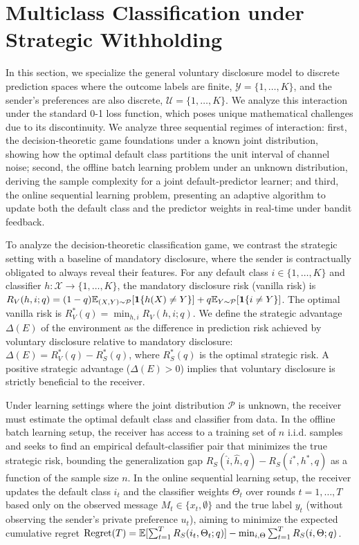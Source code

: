 \section{Multiclass Classification under Strategic Withholding}
\label{sec:classification}

In this section, we specialize the general voluntary disclosure model to discrete prediction spaces where the outcome labels are finite, $\mathcal{Y} = \{1, \dots, K\}$, and the sender's preferences are also discrete, $\mathcal{U} = \{1, \dots, K\}$. We analyze this interaction under the standard 0-1 loss function, which poses unique mathematical challenges due to its discontinuity. We analyze three sequential regimes of interaction: first, the decision-theoretic game foundations under a known joint distribution, showing how the optimal default class partitions the unit interval of channel noise; second, the offline batch learning problem under an unknown distribution, deriving the sample complexity for a joint default-predictor learner; and third, the online sequential learning problem, presenting an adaptive algorithm to update both the default class and the predictor weights in real-time under bandit feedback.

To analyze the decision-theoretic classification game, we contrast the strategic setting with a baseline of mandatory disclosure, where the sender is contractually obligated to always reveal their features. For any default class $i \in \{1,\dots,K\}$ and classifier $h: \mathcal{X} \to \{1,\dots,K\}$, the mandatory disclosure risk (vanilla risk) is $R_V(h, i; q) = (1 - q)\mathbb{E}_{(X, Y) \sim \mathcal{P}} [ \mathbf{1}\{h(X) \ne Y\} ] + q\mathbb{E}_{Y \sim \mathcal{P}} [ \mathbf{1}\{i \ne Y\} ]$. The optimal vanilla risk is $R_V^*(q) = \min_{h, i} R_V(h, i; q)$. We define the strategic advantage $\Delta(E)$ of the environment as the difference in prediction risk achieved by voluntary disclosure relative to mandatory disclosure: $\Delta(E) = R_V^*(q) - R_S^*(q)$, where $R_S^*(q)$ is the optimal strategic risk. A positive strategic advantage ($\Delta(E) > 0$) implies that voluntary disclosure is strictly beneficial to the receiver.

Under learning settings where the joint distribution $\mathcal{P}$ is unknown, the receiver must estimate the optimal default class and classifier from data. In the offline batch learning setup, the receiver has access to a training set of $n$ i.i.d. samples and seeks to find an empirical default-classifier pair that minimizes the true strategic risk, bounding the generalization gap $R_S(\hat{i}, \hat{h}, q) - R_S(i^*, h^*, q)$ as a function of the sample size $n$. In the online sequential learning setup, the receiver updates the default class $i_t$ and the classifier weights $\Theta_t$ over rounds $t=1,\dots,T$ based only on the observed message $M_t \in \{x_t, \emptyset\}$ and the true label $y_t$ (without observing the sender's private preference $u_t$), aiming to minimize the expected cumulative regret $\text{Regret}(T) = \mathbb{E}[\sum_{t=1}^T R_S(i_t, \Theta_t; q)] - \min_{i, \Theta} \sum_{t=1}^T R_S(i, \Theta; q)$.

